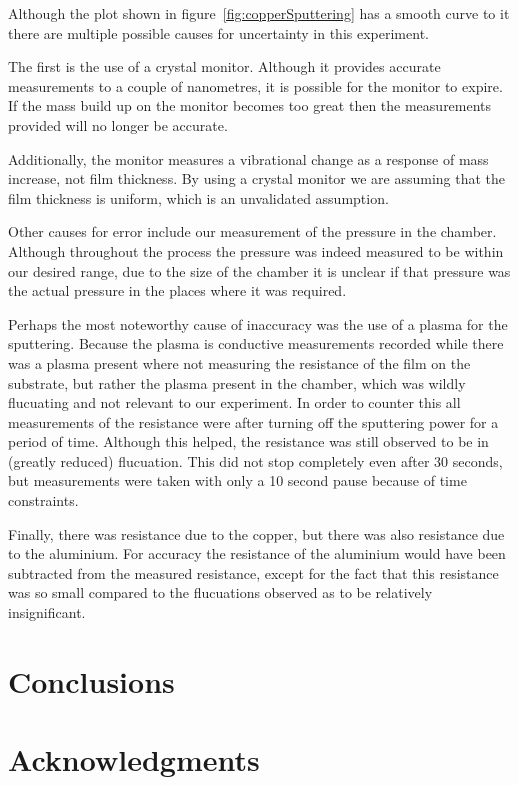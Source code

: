 \documentclass[aps,prl,twocolumn,groupedaddress,showkeys]{revtex4}
\begin{document}
Although the plot shown in figure~\ref{fig:copperSputtering} has a smooth curve to it there are multiple possible causes for uncertainty in this experiment.

The first is the use of a crystal monitor. Although it provides accurate measurements to a couple of nanometres, it is possible for the monitor to expire. If the mass build up on the monitor becomes too great then the measurements provided will no longer be accurate.

Additionally, the monitor measures a vibrational change as a response of mass increase, not film thickness. By using a crystal monitor we are assuming that the film thickness is uniform, which is an unvalidated assumption.

Other causes for error include our measurement of the pressure in the chamber. Although throughout the process the pressure was indeed measured to be within our desired range, due to the size of the chamber it is unclear if that pressure was the actual pressure in the places where it was required.

Perhaps the most noteworthy cause of inaccuracy was the use of a plasma for the sputtering. Because the plasma is conductive measurements recorded while there was a plasma present where not measuring the resistance of the film on the substrate, but rather the plasma present in the chamber, which was wildly flucuating and not relevant to our experiment. In order to counter this all measurements of the resistance were after turning off the sputtering power for a period of time. Although this helped, the resistance was still observed to be in (greatly reduced) flucuation. This did not stop completely even after 30 seconds, but measurements were taken with only a 10 second pause because of time constraints. 

Finally, there was resistance due to the copper, but there was also resistance due to the aluminium. For accuracy the resistance of the aluminium would have been subtracted from the measured resistance, except for the fact that this resistance was so small compared to the flucuations observed as to be relatively insignificant.

\section{Conclusions}

\section{Acknowledgments}
\end{document}
